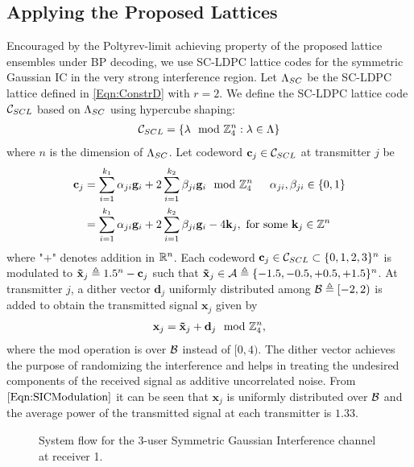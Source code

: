 \documentclass[journal,draftcls,onecolumn,12pt,twoside]{IEEEtran}
\begin{document}
\subsection{Applying the Proposed Lattices}
Encouraged by the Poltyrev-limit achieving property of the proposed lattice ensembles under BP decoding, we use SC-LDPC lattice codes for the symmetric Gaussian IC in the very strong interference region. Let $\Lambda_{SC}$ be the SC-LDPC lattice defined in \eqref{Eqn:ConstrD} with $r=2$.
We define the SC-LDPC lattice code $\mathcal{C}_{SCL}$ based on $\Lambda_{SC}$ using hypercube shaping:
\begin{align}
\mathcal{C}_{SCL}=\left\lbrace \mathbf{\lambda} \mod {\mathbb{Z}}_{4}^{n}: \mathbf{\lambda} \in \Lambda \right\rbrace
\end{align}
where $n$ is the dimension of $\Lambda_{SC}$. Let codeword $\mathbf{c}_{j}\in\mathcal{C}_{SCL}$ at transmitter $j$ be
\begin{align}
\mathbf{c}_{j}&= \sum_{i=1}^{k_{1}}\alpha_{ji}\mathbf{g}_i+2\sum_{i=1}^{k_{2}}\beta_{ji}\mathbf{g}_i \mod {\mathbb{Z}}_{4}^{n}\hspace{15pt} \alpha_{ji},\beta_{ji}\in \{0,1\}\\
\label{Eqn:SICCodeword}
&= \sum_{i=1}^{k_{1}}\alpha_{ji}\mathbf{g}_i+2\sum_{i=1}^{k_{2}}\beta_{ji}\mathbf{g}_i -4\mathbf{k}_{j}, \ \mbox{for some} \ \mathbf{k}_{j}\in\mathbb{Z}^{n}
\end{align}
where "$+$" denotes addition in $\mathbb{R}^{n}$. Each codeword $\mathbf{c}_{j}\in\mathcal{C}_{SCL}\subset\{0,1,2,3\}^{n}$ is modulated to $\mathbf{\tilde{x}}_{j}\triangleq 1.5^{n}-\mathbf{c}_{j}$ such that $\mathbf{\tilde{x}}_{j}\in\mathcal{A}\triangleq\{-1.5,-0.5,+0.5,+1.5\}^{n}$. At transmitter $j$, a dither vector $\mathbf{d}_{j}$ uniformly distributed among $\mathcal{B}\triangleq [-2,2)$ is added to obtain the transmitted signal $\mathbf{x}_j$ given by
\begin{align}
\mathbf{x}_{j}=\mathbf{\tilde{x}}_{j}+\mathbf{d}_{j} \mod {\mathbb{Z}}_{4}^{n},
\label{Eqn:SICdither}
\end{align}
where the mod operation is over $\mathcal{B}$ instead of $[0,4)$. The dither vector achieves the purpose of randomizing the interference and helps in treating the undesired components of the received signal as additive uncorrelated noise. From $\eqref{Eqn:SICModulation}$ it can be seen that $\mathbf{x}_{j}$ is uniformly distributed over $\mathcal{B}$ and the average power of the transmitted signal at each transmitter is $1.33$.

\begin{figure*}[t]
\centering
\resizebox{0.6\textwidth}{!}{

}
\caption{System flow for the 3-user Symmetric Gaussian Interference channel at receiver 1.}
\label{Fig:SIC_decoder}
\end{figure*}
\end{document}

